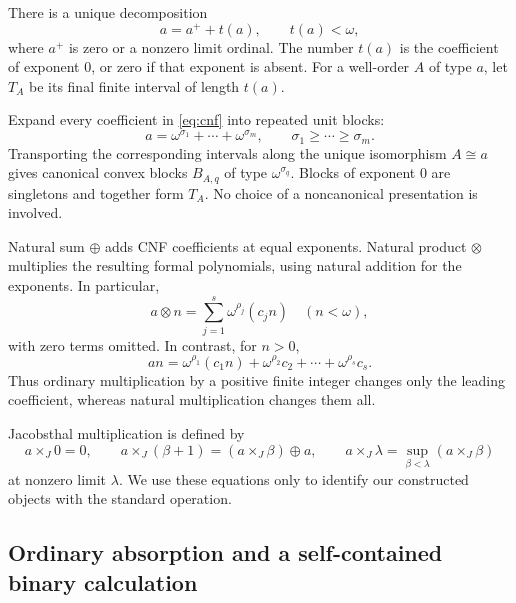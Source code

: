 \documentclass[11pt,letterpaper]{article}
\theoremstyle{definition}
\theoremstyle{remark}
\newcommand{\J}{\mathbin{\times_{\!J}}}
\begin{document}
There is a unique decomposition
\begin{equation}\label{eq:tail}
 a=a^++t(a),\qquad t(a)<\omega,
\end{equation}
where $a^+$ is zero or a nonzero limit ordinal. The number $t(a)$ is the
coefficient of exponent $0$, or zero if that exponent is absent.
For a well-order $A$ of type $a$, let $T_A$ be its final finite interval of
length $t(a)$.

Expand every coefficient in \eqref{eq:cnf} into repeated unit blocks:
\begin{equation}\label{eq:unit-cnf}
 a=\omega^{\sigma_1}+\cdots+\omega^{\sigma_m},
 \qquad \sigma_1\geq\cdots\geq\sigma_m.
\end{equation}
Transporting the corresponding intervals along the unique isomorphism
$A\cong a$ gives canonical convex blocks $B_{A,q}$ of type
$\omega^{\sigma_q}$. Blocks of exponent $0$ are singletons and together
form $T_A$. No choice of a noncanonical presentation is involved.

Natural sum $\oplus$ adds CNF coefficients at equal exponents. Natural
product $\otimes$ multiplies the resulting formal polynomials, using
natural addition for the exponents. In particular,
\begin{equation}\label{eq:finite-natural}
 a\otimes n=\sum_{j=1}^{s}\omega^{\rho_j}(c_jn)
 \quad(n<\omega),
\end{equation}
with zero terms omitted. In contrast, for $n>0$,
\begin{equation}\label{eq:finite-ordinary}
 an=\omega^{\rho_1}(c_1n)+\omega^{\rho_2}c_2+\cdots+
      \omega^{\rho_s}c_s.
\end{equation}
Thus ordinary multiplication by a positive finite integer changes only
the leading coefficient, whereas natural multiplication changes them all.

Jacobsthal multiplication is defined by
\begin{equation}\label{eq:J-def}
 a\J0=0,\qquad a\J(\beta+1)=(a\J\beta)\oplus a,
 \qquad a\J\lambda=\sup_{\beta<\lambda}(a\J\beta)
\end{equation}
at nonzero limit $\lambda$. We use these equations only to identify our
constructed objects with the standard operation.

\subsection{Ordinary absorption and a self-contained binary calculation}
\end{document}

